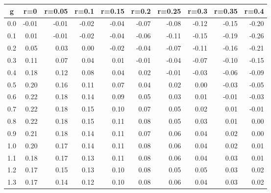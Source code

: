 %
\begin{table}[!tbp]
 \begin{center}
 \begin{tabular}{rrrrrrrrrr}\hline\hline
\multicolumn{1}{c}{g}&\multicolumn{1}{c}{r=0}&\multicolumn{1}{c}{r=0.05}&\multicolumn{1}{c}{r=0.1}&\multicolumn{1}{c}{r=0.15}&\multicolumn{1}{c}{r=0.2}&\multicolumn{1}{c}{r=0.25}&\multicolumn{1}{c}{r=0.3}&\multicolumn{1}{c}{r=0.35}&\multicolumn{1}{c}{r=0.4}\tabularnewline
\hline
0.0&-0.01&-0.01&-0.02&-0.04&-0.07&-0.08&-0.12&-0.15&-0.20\tabularnewline
0.1& 0.01&-0.01&-0.02&-0.04&-0.06&-0.11&-0.15&-0.19&-0.26\tabularnewline
0.2& 0.05& 0.03& 0.00&-0.02&-0.04&-0.07&-0.11&-0.16&-0.21\tabularnewline
0.3& 0.11& 0.07& 0.04& 0.01&-0.01&-0.04&-0.07&-0.10&-0.15\tabularnewline
0.4& 0.18& 0.12& 0.08& 0.04& 0.02&-0.01&-0.03&-0.06&-0.09\tabularnewline
0.5& 0.20& 0.16& 0.11& 0.07& 0.04& 0.02& 0.00&-0.03&-0.05\tabularnewline
0.6& 0.22& 0.18& 0.14& 0.09& 0.05& 0.03& 0.01&-0.01&-0.03\tabularnewline
0.7& 0.22& 0.18& 0.15& 0.10& 0.07& 0.05& 0.02& 0.01&-0.01\tabularnewline
0.8& 0.22& 0.18& 0.15& 0.11& 0.08& 0.05& 0.03& 0.01& 0.00\tabularnewline
0.9& 0.21& 0.18& 0.14& 0.11& 0.07& 0.06& 0.04& 0.02& 0.00\tabularnewline
1.0& 0.20& 0.17& 0.14& 0.11& 0.08& 0.06& 0.04& 0.02& 0.01\tabularnewline
1.1& 0.18& 0.17& 0.13& 0.11& 0.08& 0.06& 0.04& 0.03& 0.01\tabularnewline
1.2& 0.17& 0.15& 0.13& 0.10& 0.08& 0.05& 0.05& 0.03& 0.02\tabularnewline
1.3& 0.17& 0.14& 0.12& 0.10& 0.08& 0.06& 0.04& 0.03& 0.02\tabularnewline
\hline
\end{tabular}

\end{center}

\end{table}


